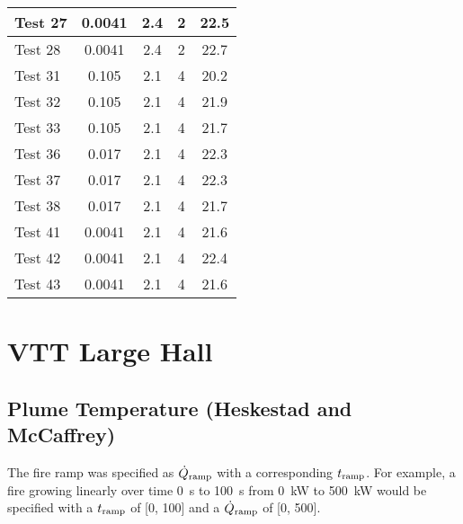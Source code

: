 \begin{table}[!ht]
\begin{center}
\begin{tabular}{|l|c|c|c|c|}
Test 27    &  0.0041           &  2.4       &  2              &  22.5                  \\ \hline
Test 28    &  0.0041           &  2.4       &  2              &  22.7                  \\ \hline
Test 31    &  0.105            &  2.1       &  4              &  20.2                  \\ \hline
Test 32    &  0.105            &  2.1       &  4              &  21.9                  \\ \hline
Test 33    &  0.105            &  2.1       &  4              &  21.7                  \\ \hline
Test 36    &  0.017            &  2.1       &  4              &  22.3                  \\ \hline
Test 37    &  0.017            &  2.1       &  4              &  22.3                  \\ \hline
Test 38    &  0.017            &  2.1       &  4              &  21.7                  \\ \hline
Test 41    &  0.0041           &  2.1       &  4              &  21.6                  \\ \hline
Test 42    &  0.0041           &  2.1       &  4              &  22.4                  \\ \hline
Test 43    &  0.0041           &  2.1       &  4              &  21.6                  \\ \hline
\end{tabular}
\end{center}
\end{table}


\clearpage


\section{VTT Large Hall}

\subsection*{Plume Temperature (Heskestad and McCaffrey)~\cite{SFPE:Heskestad, McCaffrey:NBSIR_79-1910}}

The fire ramp was specified as $\dot Q\sb{ramp}$ with a corresponding $t\sb{ramp}$.
For example, a fire growing linearly over time 0~s to 100~s from 0~kW to 500~kW
would be specified with a $t\sb{ramp}$ of [0, 100] and a $\dot Q\sb{ramp}$ of [0, 500].

